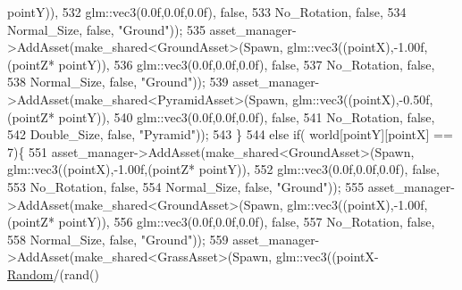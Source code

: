 \begin{DoxyCode}
      pointY)),
532                                                              glm::vec3(0.0f,0.0f,0.0f), \textcolor{keyword}{false},
533                                                              No\_Rotation, \textcolor{keyword}{false},
534                                                              Normal\_Size, \textcolor{keyword}{false}, \textcolor{stringliteral}{"Ground"}));
535             asset\_manager->AddAsset(make\_shared<GroundAsset>(Spawn, glm::vec3((pointX),-1.00f,(pointZ*
      pointY)),
536                                                              glm::vec3(0.0f,0.0f,0.0f), \textcolor{keyword}{false},
537                                                              No\_Rotation, \textcolor{keyword}{false},
538                                                              Normal\_Size, \textcolor{keyword}{false}, \textcolor{stringliteral}{"Ground"}));
539             asset\_manager->AddAsset(make\_shared<PyramidAsset>(Spawn, glm::vec3((pointX),-0.50f,(pointZ*
      pointY)),
540                                                               glm::vec3(0.0f,0.0f,0.0f), \textcolor{keyword}{false},
541                                                               No\_Rotation, \textcolor{keyword}{false},
542                                                               Double\_Size, \textcolor{keyword}{false}, \textcolor{stringliteral}{"Pyramid"}));
543    \}
544     \textcolor{keywordflow}{else} \textcolor{keywordflow}{if}( world[pointY][pointX] == 7)\{
551             asset\_manager->AddAsset(make\_shared<GroundAsset>(Spawn, glm::vec3((pointX),-1.00f,(pointZ*
      pointY)),
552                                                              glm::vec3(0.0f,0.0f,0.0f), \textcolor{keyword}{false},
553                                                              No\_Rotation, \textcolor{keyword}{false},
554                                                              Normal\_Size, \textcolor{keyword}{false}, \textcolor{stringliteral}{"Ground"}));
555             asset\_manager->AddAsset(make\_shared<GroundAsset>(Spawn, glm::vec3((pointX),-1.00f,(pointZ*
      pointY)),
556                                                              glm::vec3(0.0f,0.0f,0.0f), \textcolor{keyword}{false},
557                                                              No\_Rotation, \textcolor{keyword}{false},
558                                                              Normal\_Size, \textcolor{keyword}{false}, \textcolor{stringliteral}{"Ground"}));
559             asset\_manager->AddAsset(make\_shared<GrassAsset>(Spawn, glm::vec3((pointX-
      \hyperlink{class_game_world_a56652cc9880b3ba1be61395066c863c3}{Random}/(rand() %

\end{DoxyCode}
